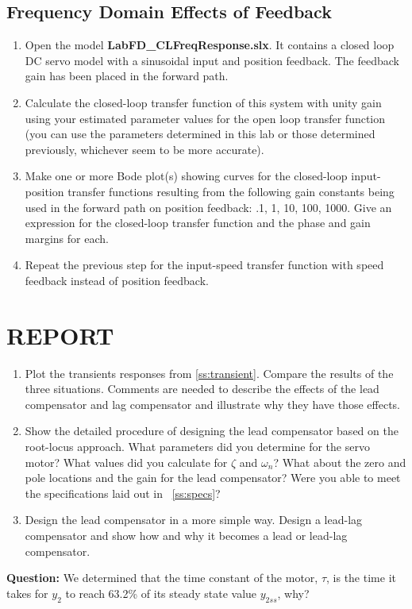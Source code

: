 \documentclass[11pt,a4paper]{article}
\begin{document}
\subsection{Frequency Domain Effects of Feedback}
\begin{enumerate}
\item Open the model \textbf{LabFD\_CLFreqResponse.slx}. It contains a closed loop DC servo model with a sinusoidal input and position feedback. The feedback gain has been placed in the forward path.

\item Calculate the closed-loop transfer function of this system with unity gain using your estimated parameter values for the open loop transfer function (you can use the parameters determined in this lab or those determined previously, whichever seem to be more accurate).

\item Make one or more Bode plot(s) showing curves for the closed-loop input-position transfer functions resulting from the following gain constants being used in the forward path on position feedback: {.1, 1, 10, 100, 1000}.  Give an expression for the closed-loop transfer function and the phase and gain margins for each.

\item Repeat the previous step for the input-speed transfer function with speed feedback instead of position feedback.

\end{enumerate}



\section{REPORT}
\begin{enumerate}
\item Plot the transients responses from \ref{ss:transient}. Compare the results of the three situations. Comments are needed to describe the effects of the lead compensator and lag compensator and illustrate why they have those effects.
\item Show the detailed procedure of designing the lead compensator based on the root-locus approach. What parameters did you determine for the servo motor? What values did you calculate for $\zeta$ and $\omega_{n}$? What about the zero and pole locations and the gain for the lead compensator? Were you able to meet the specifications laid out in ~\ref{ss:specs}?
\item Design the lead compensator in a more simple way. Design a lead-lag compensator and show how and why it becomes a lead or lead-lag compensator.
\end{enumerate}
\textbf{Question:} We determined that the time constant of the motor, $\tau$, is the time it takes for $y_{2}$ to reach 63.2\% of its steady state value $y_{2ss}$, why?
\end{document}
